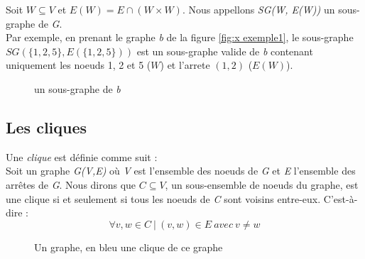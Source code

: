 \documentclass[a4paper, 12pt]{article}
\begin{document}
Soit $ W \subseteq V $ et $ E(W) = E \cap (W \times W) $. Nous appellons \emph{SG(W, E(W))} un sous-graphe de \emph{G}.\\
Par exemple, en prenant le graphe \textit{b} de la figure \ref{fig:x exemple1}, le sous-graphe \(SG(\{1, 2, 5\}, E(\{1, 2, 5\}))\) est un sous-graphe valide de \textit{b} contenant uniquement les noeuds 1, 2 et 5 (\(W\)) et l'arrete \((1,2)\) (\(E(W)\)).

\begin{figure}
  \centering
  \caption{un sous-graphe de \textit{b}}
\end{figure}

\subsection{Les cliques}%
\label{subsec:cliques}

Une \textit{clique} est définie comme suit :\\
Soit un graphe \emph{G(V,E)} où \emph{V} est l'ensemble des noeuds de \emph{G} et \emph{E} l'ensemble des arrêtes de \emph{G}. Nous dirons que \(C \subseteq V\), un sous-ensemble de noeuds du graphe, est une clique si et seulement si tous les noeuds de \emph{C} sont voisins entre-eux.
C'est-à-dire :
$$ \forall v, w \in C \ | \ (v, w)\in E \ avec\  v \neq w$$

\begin{figure}[h]
  \centering
  \caption{Un graphe, en bleu une clique de ce graphe}
  \label{fig:x clique1}
\end{figure}
\end{document}
